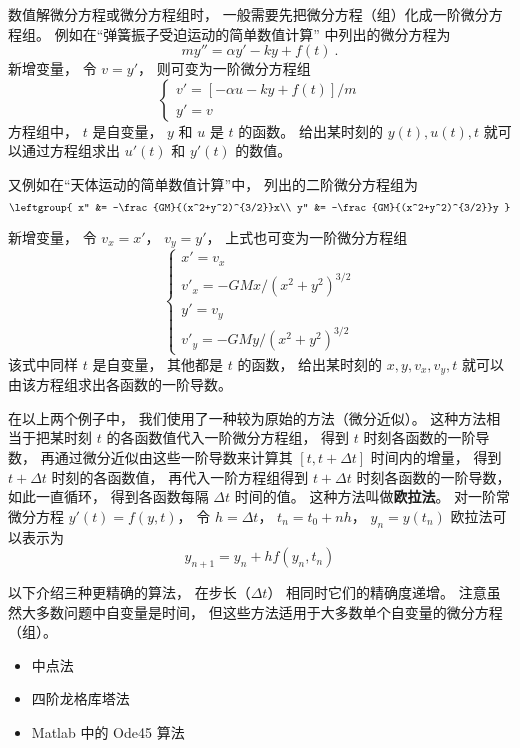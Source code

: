 

数值解微分方程或微分方程组时， 一般需要先把微分方程（组）化成一阶微分方程组。 例如在“弹簧振子受迫运动的简单数值计算” 中列出的微分方程为
\begin{equation}
m y'' = \alpha y' - ky + f(t)~.
\end{equation}
新增变量， 令 $v = y'$， 则可变为一阶微分方程组
\begin{equation}
\begin{cases}
v' = [-\alpha u - ky + f(t)]/m\\
y' = v
\end{cases}
\end{equation}
方程组中， $t$ 是自变量， $y$ 和 $u$ 是 $t$ 的函数。 给出某时刻的 $y(t), u(t), t$ 就可以通过方程组求出 $u'(t)$ 和 $y'(t)$ 的数值。

又例如在“天体运动的简单数值计算”中， 列出的二阶微分方程组为
\begin{equation}
\leftgroup{
x'' &= -\frac{GM}{(x^2+y^2)^{3/2}}x\\
y'' &= -\frac{GM}{(x^2+y^2)^{3/2}}y
}\end{equation}

新增变量， 令 $v_x = x'$， $v_y = y'$， 上式也可变为一阶微分方程组
\begin{equation}\label{eq_OdeNum_4}
\begin{cases}
x' = v_x\\
v'_x = -GMx/(x^2 + y^2)^{3/2}\\
y' = v_y\\
v'_y = -GMy/(x^2 + y^2)^{3/2}
\end{cases}
\end{equation}
该式中同样 $t$ 是自变量， 其他都是 $t$ 的函数， 给出某时刻的 $x, y, v_x, v_y, t$ 就可以由该方程组求出各函数的一阶导数。

在以上两个例子中， 我们使用了一种较为原始的方法（微分近似）。 这种方法相当于把某时刻 $t$ 的各函数值代入一阶微分方程组， 得到 $t$ 时刻各函数的一阶导数， 再通过微分近似由这些一阶导数来计算其 $[t, t + \Delta t]$ 时间内的增量， 得到 $t +\Delta t$ 时刻的各函数值， 再代入一阶方程组得到 $t +\Delta t$ 时刻各函数的一阶导数， 如此一直循环， 得到各函数每隔 $\Delta t$ 时间的值。 这种方法叫做\textbf{欧拉法}。 对一阶常微分方程 $y'(t) = f(y, t)$， 令 $h = \Delta t$， $t_n = t_0 + nh$， $y_n = y(t_n)$ 欧拉法可以表示为
\begin{equation}\label{eq_OdeNum_5}
y_{n+1} = y_n + h f(y_n, t_n)
\end{equation}

以下介绍三种更精确的算法， 在步长（$\Delta t$） 相同时它们的精确度递增。 注意虽然大多数问题中自变量是时间， 但这些方法适用于大多数单个自变量的微分方程（组）。

\begin{itemize}
\item 中点法
\item 四阶龙格库塔法
\item Matlab 中的 Ode45 算法
\end{itemize}












